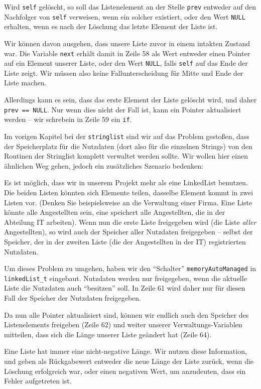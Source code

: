 Wird \texttt{self} gelöscht, so soll das Listenelement an der Stelle \texttt{prev} entweder auf den Nachfolger von \texttt{self} verweisen, wenn ein solcher existiert, oder den Wert \texttt{NULL} erhalten, wenn es nach der Löschung das letzte Element der Liste ist.

Wir können davon ausgehen, dass unsere Liste zuvor in einem intakten Zustand war. Die Variable \texttt{next} erhält damit in Zeile 58 als Wert entweder einen Pointer auf ein Element unserer Liste, oder den Wert \texttt{NULL}, falls \texttt{self} auf das Ende der Liste zeigt. Wir müssen also keine Fallunterscheidung für Mitte und Ende der Liste machen.

Allerdings kann es sein, dass das erste Element der Liste gelöscht wird, und daher \texttt{prev == NULL}. Nur wenn dies nicht der Fall ist, kann ein Pointer aktualisiert werden -- wir schrebein in Zeile 59 ein \texttt{if}.

Im vorigen Kapitel bei der \texttt{stringlist} sind wir auf das Problem gestoßen, dass der Speicherplatz für die Nutzdaten (dort also für die einzelnen Strings) von den Routinen der Stringlist komplett verwaltet werden sollte. Wir wollen hier einen ähnlichen Weg gehen, jedoch ein zusätzliches Szenario bedenken:

Es ist möglich, dass wir in unserem Projekt mehr als eine LinkedList benutzen. Die beiden Listen könnten sich Elemente teilen, \ie dasselbe Element kommt in zwei Listen vor. (Denken Sie beispielsweise an die Verwaltung einer Firma. Eine Liste könnte alle Angestellten sein, eine speichert alle Angestellten, die in der Abteilung IT arbeiten). Wenn nun die erste Liste freigegeben wird (\eg die Liste \emph{aller} Angestellten), so wird auch der Speicher aller Nutzdaten freigegeben -- selbst der Speicher, der in der zweiten Liste (die der Angestellten in der IT) registrierten Nutzdaten. 

Um dieses Problem zu umgehen, haben wir den \enquote{Schalter} \texttt{memoryAutoManaged} in \texttt{linkedList\_t} eingebaut. Nutzdaten werden nur freigegeben, wenn die aktuelle Liste die Nutzdaten auch \enquote{besitzen} soll. In Zeile 61 wird daher nur für diesen Fall der Speicher der Nutzdaten freigegeben.

Da nun alle Pointer aktualisiert sind, können wir endlich auch den Speicher des Listenelements freigeben (Zeile 62) und weiter unserer Verwaltungs-Variablen mitteilen, dass sich die Länge unserer Liste geändert hat (Zeile 64). 

Eine Liste hat immer eine nicht-negative Länge. Wir nutzen diese Information, und geben als Rückgabewert entweder die neue Länge der Liste zurück, wenn die Löschung erfolgreich war, oder einen negativen Wert, um anzudeuten, dass ein Fehler aufgetreten ist.

